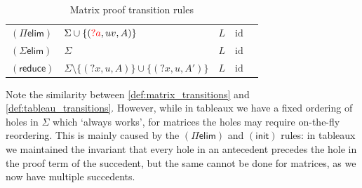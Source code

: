 \documentclass[twoside]{report}
\begin{document}
\begin{table}
\begin{tabular}{lllll}
        \\
        $(\Pi\mathsf{elim})$
                                & $\Sigma \cup \{(\textcolor{red}{?a}, uv, A)\}$
                                & $L$
                                & $\mathrm{id}$
        \\
        $(\Sigma\mathsf{elim})$
                                & $\Sigma$
                                & $L$
                                & $\mathrm{id}$
        \\
        $(\mathsf{reduce})$
                                & $\Sigma \setminus \{({?x}, u, A)\} \cup \{({?x}, u, A')\}$
                                & $L$
                                & $\mathrm{id}$
        \\
        \hline
    \end{tabular}
    \caption{Matrix proof transition rules}
    \label{tab:matrix_transitions}
\end{table}

Note the similarity between \cref{def:matrix_transitions} and \cref{def:tableau_transitions}. However, while in tableaux we have a fixed ordering of holes in $\Sigma$ which `always works', for matrices the holes may require on-the-fly reordering. This is mainly caused by the $(\Pi\mathsf{elim})$ and $(\mathsf{init})$ rules: in tableaux we maintained the invariant that every hole in an antecedent precedes the hole in the proof term of the succedent, but the same cannot be done for matrices, as we now have multiple succedents.
\end{document}
